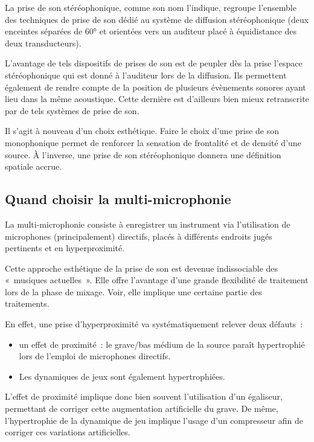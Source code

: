 \documentclass[
]{book}
\providecommand{\tightlist}{%
  \setlength{\itemsep}{0pt}\setlength{\parskip}{0pt}}
\begin{document}
La prise de son stéréophonique, comme son nom l'indique, regroupe l'ensemble des techniques de prise de son dédié au système de diffusion stéréophonique (deux enceintes séparées de 60° et orientées vers un auditeur placé à équidistance des deux transducteurs).

L'avantage de tels dispositifs de prises de son est de peupler dès la prise l'espace stéréophonique qui est donné à l'auditeur lors de la diffusion. Ils permettent également de rendre compte de la position de plusieurs évènements sonores ayant lieu dans la même acoustique. Cette dernière est d'ailleurs bien mieux retranscrite par de tels systèmes de prise de son.

Il s'agit à nouveau d'un choix esthétique. Faire le choix d'une prise de son monophonique permet de renforcer la sensation de frontalité et de densité d'une source. À l'inverse, une prise de son stéréophonique donnera une définition spatiale accrue.

\hypertarget{quand-choisir-la-multi-microphonie}{%
\subsection{Quand choisir la multi-microphonie}\label{quand-choisir-la-multi-microphonie}}

La multi-microphonie consiste à enregistrer un instrument via l'utilisation de microphones (principalement) directifs, placés à différents endroits jugés pertinents et en hyperproximité.

Cette approche esthétique de la prise de son est devenue indissociable des «~musiques actuelles~». Elle offre l'avantage d'une grande flexibilité de traitement lors de la phase de mixage. Voir, elle implique une certaine partie des traitements.

En effet, une prise d'hyperproximité va systématiquement relever deux défauts~:

\begin{itemize}
\tightlist
\item
  un effet de proximité~: le grave/bas médium de la source paraît hypertrophié lors de l'emploi de microphones directifs.
\item
  Les dynamiques de jeux sont également hypertrophiées.
\end{itemize}

L'effet de proximité implique donc bien souvent l'utilisation d'un égaliseur, permettant de corriger cette augmentation artificielle du grave. De même, l'hypertrophie de la dynamique de jeu implique l'usage d'un compresseur afin de corriger ces variations artificielles.
\end{document}
